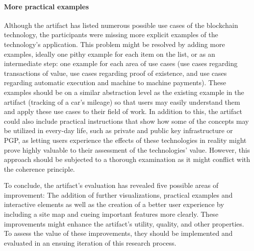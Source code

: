 \paragraph{More practical examples} Although the artifact has listed numerous possible use cases of the blockchain technology, the participants were missing more explicit examples of the technology's application. This problem might be resolved by adding more examples, ideally one pithy example for each item on the list, or as an intermediate step: one example for each area of use cases (use cases regarding transactions of value, use cases regarding proof of existence, and use cases regarding automatic execution and machine to machine payments). These examples should be on a similar abstraction level as the existing example in the artifact (tracking of a car's mileage) so that users may easily understand them and apply these use cases to their field of work. In addition to this, the artifact could also include practical instructions that show how some of the concepts may be utilized in every-day life, such as private and public key infrastructure or PGP, as letting users experience the effects of these technologies in reality might prove highly valuable to their assessment of the technologies' value. However, this approach should be subjected to a thorough examination as it might conflict with the coherence principle.

To conclude, the artifact's evaluation has revealed five possible areas of improvement: The addition of further visualizations, practical examples and interactive elements as well as the creation of a better user experience by including a site map and cueing important features more clearly. These improvements might enhance the artifact's utility, quality, and other properties. To assess the value of these improvements, they should be implemented and evaluated in an ensuing iteration of this research process.